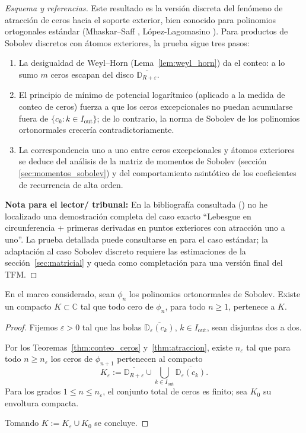 \begin{proof}[Esquema y referencias]
	Este resultado es la versión discreta del fenómeno de atracción de ceros hacia el soporte exterior, bien conocido para polinomios ortogonales estándar (Mhaskar--Saff \cite{stahl1992general}, López-Lagomasino \cite{lopez1999zero}). Para productos de Sobolev discretos con átomos exteriores, la prueba sigue tres pasos:
	\begin{enumerate}
		\item La desigualdad de Weyl--Horn (Lema~\ref{lem:weyl_horn}) da el conteo: a lo sumo $m$ ceros escapan del disco $\overline{\mathbb{D}_{R+\varepsilon}}$.
		\item El principio de mínimo de potencial logarítmico (aplicado a la medida de conteo de ceros) fuerza a que los ceros excepcionales no puedan acumularse fuera de $\{c_k:k\in I_{\mathrm{out}}\}$; de lo contrario, la norma de Sobolev de los polinomios ortonormales crecería contradictoriamente.
		\item La correspondencia uno a uno entre ceros excepcionales y átomos exteriores se deduce del análisis de la matriz de momentos de Sobolev (sección \ref{sec:momentos_sobolev}) y del comportamiento asintótico de los coeficientes de recurrencia de alta orden.
	\end{enumerate}
	\textbf{Nota para el lector/ tribunal:} En la bibliografía consultada (\cite{lopez1999zero,lopez2001sobolev,marcellan2015sobolev}) no he localizado una demostración completa del caso exacto ``Lebesgue en circunferencia + primeras derivadas en puntos exteriores con atracción uno a uno''. La prueba detallada puede consultarse en \cite[Cap.~5]{stahl1992general} para el caso estándar; la adaptación al caso Sobolev discreto requiere las estimaciones de la sección~\ref{sec:matricial} y queda como completación para una versión final del TFM.
\end{proof}

\begin{thm}\label{thm:acotacion_via_Q_m}
	En el marco considerado, sean $\phi_n$ los polinomios ortonormales de Sobolev.
	Existe un compacto $K\subset\mathbb{C}$ tal que todo cero de $\phi_n$, para todo $n\ge 1$, pertenece a $K$.
\end{thm}

\begin{proof}
	Fijemos $\varepsilon>0$ tal que las bolas $\overline{\mathbb{D}_{\varepsilon}(c_k)}$, $k\in I_{\mathrm{out}}$, sean disjuntas dos a dos.

	Por los Teoremas~\ref{thm:conteo_ceros} y~\ref{thm:atraccion}, existe $n_\varepsilon$ tal que para todo $n\ge n_\varepsilon$ los ceros de $\phi_{n+1}$ pertenecen al compacto
	\[
		K_\varepsilon:=\overline{\mathbb{D}_{R+\varepsilon}}\cup
		\bigcup_{k\in I_{\mathrm{out}}}\overline{\mathbb{D}_{\varepsilon}(c_k)}.
	\]
	Para los grados $1\le n\le n_\varepsilon$, el conjunto total de ceros es finito; sea $K_0$ su envoltura compacta.

	Tomando $K:=K_\varepsilon\cup K_0$ se concluye.
\end{proof}

